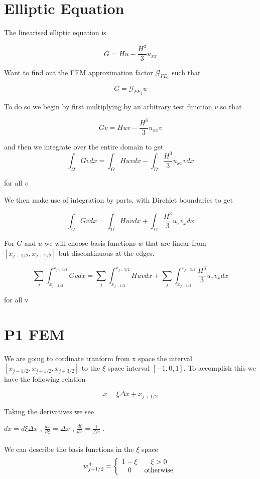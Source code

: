 \documentclass[12pt]{article}
\begin{document}
\section{Elliptic Equation}
The linearised elliptic equation is

\[G = Hu - \frac{H^3}{3}u_{xx}\]

Want to find out the FEM approximation factor $\mathcal{G}_{FE_1}$ such that

\[G = \mathcal{G}_{FE_1} u\]

To do so we begin by first multiplying by an arbitrary test function $v$ so that

\[Gv = Huv - \frac{H^3}{3}u_{xx}v\]

and then we integrate over the entire domain to get 
\[\int_\Omega Gv dx = \int_\Omega Huv dx - \int_\Omega \frac{H^3}{3}u_{xx}vdx\]

for all $v$

We then make use of integration by parts, with Dirchlet boundaries to get

\[\int_\Omega Gv dx = \int_\Omega Huv dx + \int_\Omega \frac{H^3}{3}u_{x}v_xdx\]

For $G$ and $u$ we will choose basis functions $w$ that are linear from $[x_{j-1/2}, x_{j+1/2}]$ but discontinuous at the edges.

\[\sum_{j}\int_{x_{j-1/2}}^{x_{j+3/2}} Gv dx = \sum_{j}\int_{x_{j-1/2}}^{x_{j+3/2}}  Huv dx + \sum_{j}\int_{x_{j-1/2}}^{x_{j+3/2}} \frac{H^3}{3}u_{x}v_{x}dx\]


for all v

\section{P1 FEM}
We are going to cordinate tranform from x space the interval $[x_{j-1/2},x_{j+1/2} ,x_{j+3/2}]$ to the $\xi$ space interval $[-1,0,1]$. To accomplish this we have the following relation

$$x = \xi\Delta x + x_{j+1/2}$$

Taking the derivatives we see


$dx = d\xi\Delta x$ , $\frac{dx}{d\xi} = \Delta x$ , $\frac{d\xi}{dx} = \frac{1}{\Delta x}$ . \\ \\ We can describe the basis functions in the $\xi$ space
\begin{equation}
w^+_{j+1/2} = \left\lbrace \begin{array}{c c}
1-\xi & \xi > 0 \\
0 & \text{otherwise}
\end{array} 
\right.
\end{equation}
\end{document}
